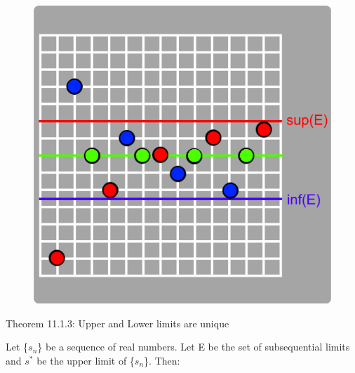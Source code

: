 \begin{figure}[h]
	\centering
	\includegraphics[scale=0.3]{Images/11.1.2.png}
\end{figure}

{ \color{red} Theorem 11.1.3: Upper and Lower limits are unique }

	\begin{adjustbox}{minipage=14cm, right, vspace=0.1cm 0.1cm}
		Let \{$s_n$\} be a sequence of real numbers.
		Let E be the set of subsequential limits and
		$s^*$ be the upper limit of \{$s_n$\}. Then:
	\end{adjustbox}

